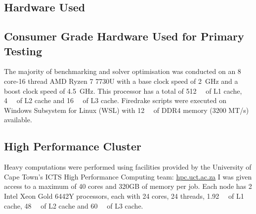 \documentclass{article}
\begin{document}
\begin{appendices}
\section{Hardware Used}\label{app:hardware}

\subsection{Consumer Grade Hardware Used for Primary Testing}\label{app:hardware_consumer}

The majority of benchmarking and solver optimisation was conducted on an 8 core-16 thread AMD Ryzen 7 7730U with a base clock speed of \qty{2}{\giga \hertz} and a boost clock speed of \qty{4.5}{\giga \hertz}. This processor has a total of \qty{512}{\kilo \byte} of L1 cache, \qty{4}{\mega \byte} of L2 cache and \qty{16}{\mega \byte} of L3 cache. Firedrake scripts were executed on Windows Subsystem for Linux (WSL) with \qty{12}{\giga \byte} of DDR4 memory (3200 MT/s) available.

\subsection{High Performance Cluster}\label{app:hardware_hpc}

Heavy computations were performed using facilities provided by the University of Cape Town’s ICTS High Performance Computing team: \href{https://hpc.uct.ac.za}{hpc.uct.ac.za} \cite{HPC}
I was given access to a maximum of 40 cores and 320GB of memory per job.
Each node has 2 Intel Xeon Gold 6442Y processors, each with 24 cores, 24 threads, \qty{1.92}{\mega\byte} of L1 cache, \qty{48}{\mebi\byte} of L2 cache and \qty{60}{\mebi\byte} of L3 cache.

\end{appendices}
\end{document}

